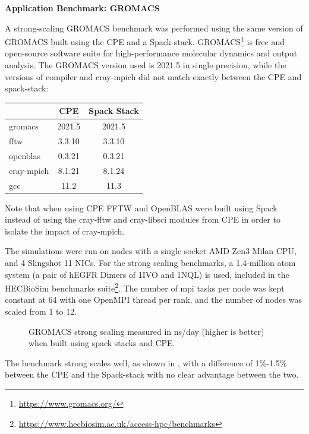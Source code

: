 \noindent\textbf{Application Benchmark: GROMACS}

A strong-scaling GROMACS benchmark was performed using the same version of GROMACS built using the CPE and a Spack-stack.
GROMACS\footnote{\url{https://www.gromacs.org/}} is free and open-source software suite for high-performance molecular dynamics and output analysis.
The GROMACS version used is 2021.5 in single precision, while the versions of compiler and cray-mpich did not match exactly between the CPE and spack-stack:
\begin{center}
    \begin{tabular}{l |c  c }
                      & CPE   & Spack Stack \\
          \hline
        gromacs       & 2021.5   & 2021.5   \\
        fftw          & 3.3.10   & 3.3.10   \\
        openblas      & 0.3.21   & 0.3.21   \\
        cray-mpich    & 8.1.21   & 8.1.24   \\
        gcc           & 11.2     & 11.3     \\
    \end{tabular}
\end{center}
Note that when using CPE FFTW and OpenBLAS were built using Spack instead of using the cray-fftw and cray-libsci modules from CPE in order to isolate the impact of cray-mpich.

The simulations were run on nodes with a single socket AMD Zen3 Milan CPU, and 4 Slingshot 11 NICs.
For the strong scaling benchmarks, a 1.4-million atom system (a pair of hEGFR Dimers of 1IVO and 1NQL) is used, included in the HECBioSim benchmarks suite\footnote{\url{https://www.hecbiosim.ac.uk/access-hpc/benchmarks}}.
The number of mpi tasks per node was kept constant at 64 with one OpenMPI thread per rank, and the number of nodes was scaled from 1 to 12.

\begin{figure}[htp!]
    \begin{center}
        
    \end{center}
    \caption{GROMACS strong scaling measured in ns/day (higher is better) when built using spack stacks and CPE.}
    \label{fig:gromacs-strong}
\end{figure}

The benchmark strong scales well, as shown in , with a difference of 1\%-1.5\% between the CPE and the Spack-stack with no clear advantage between the two.

